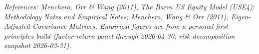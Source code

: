 \documentclass[11pt]{article}
\theoremstyle{definition}
\theoremstyle{plain}
\theoremstyle{remark}
\begin{document}
\begin{center}\small\itshape
References: Menchero, Orr \& Wang (2011), \textit{The Barra US Equity Model (USE4): Methodology Notes} and \textit{Empirical Notes}; Menchero, Wang \& Orr (2011), \textit{Eigen-Adjusted Covariance Matrices}. Empirical figures are from a personal first-principles build (factor-return panel through 2026-04-30; risk-decomposition snapshot 2026-03-31).
\end{center}
\end{document}
